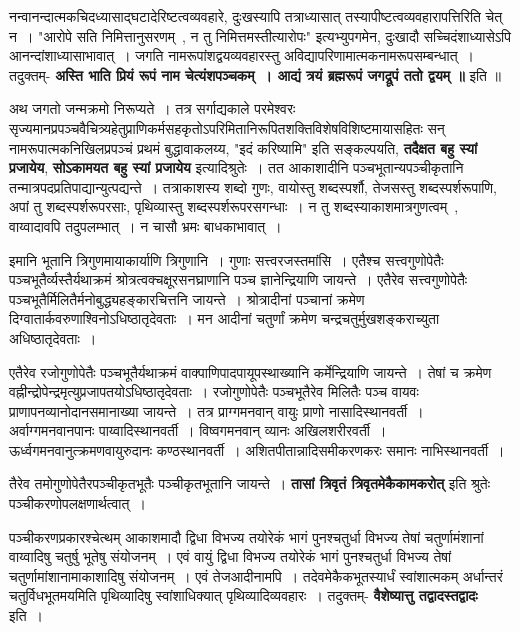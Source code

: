 	नन्वानन्दात्मकचिदध्यासाद्घटादेरिष्टत्वव्यवहारे, दुःखस्यापि तत्राध्यासात् तस्यापीष्टत्वव्यवहारापत्तिरिति चेत् न~। "आरोपे सति निमित्तानुसरणम्~, न तु निमित्तमस्तीत्यारोपः" इत्यभ्युपगमेन, दुःखादौ सच्चिदंशाध्यासेऽपि आनन्दांशाध्यासाभावात्~। जगति नामरूपांशद्वयव्यवहारस्तु अविद्यापरिणामात्मकनामरूपसम्बन्धात्~। तदुक्तम्- {\bfseries अस्ति भाति प्रियं रूपं नाम चेत्यंशपञ्चकम्~। आद्यं त्रयं ब्रह्मरूपं जगद्रूपं ततो द्वयम् ॥} इति ॥\par
	अथ जगतो जन्मक्रमो निरूप्यते~। तत्र सर्गाद्यकाले परमेश्वरः सृज्यमानप्रपञ्चवैचित्र्यहेतुप्राणिकर्मसहकृतोऽपरिमितानिरूपितशक्तिविशेषविशिष्टमायासहितः सन् नामरूपात्मकनिखिलप्रपञ्चं प्रथमं बुद्धावाकलय्य, "इदं करिष्यामि" इति सङ्कल्पयति, {\bfseries तदैक्षत बहु स्यां प्रजायेय}, {\bfseries सोऽकामयत बहु स्यां प्रजायेय} इत्यादिश्रुतेः~। तत आकाशादीनि पञ्चभूतान्यपञ्चीकृतानि तन्मात्रपदप्रतिपाद्यान्युत्पद्यन्ते~। तत्राकाशस्य शब्दो गुणः, वायोस्तु शब्दस्पर्शौ, तेजसस्तु शब्दस्पर्शरूपाणि, अपां तु शब्दस्पर्शरूपरसाः, पृथिव्यास्तु शब्दस्पर्शरूपरसगन्धाः~। न तु शब्दस्याकाशमात्रगुणत्वम्~, वाय्वादावपि तदुपलम्भात्~। न चासौ भ्रमः बाधकाभावात्~।\par
	इमानि भूतानि त्रिगुणमायाकार्याणि त्रिगुणानि~। गुणाः सत्त्वरजस्तमांसि~। एतैश्च सत्त्वगुणोपेतैः पञ्चभूतैर्व्यस्तैर्यथाक्रमं श्रोत्रत्वक्चक्षूरसनघ्राणानि पञ्च ज्ञानेन्द्रियाणि जायन्ते~। एतैरेव सत्त्वगुणोपेतैः पञ्चभूतैर्मिलितैर्मनोबुद्ध्यहङ्कारचित्तनि जायन्ते~। श्रोत्रादीनां पञ्चानां क्रमेण दिग्वातार्कवरुणाश्विनोऽधिष्ठातृदेवताः~। मन आदीनां चतुर्णां क्रमेण चन्द्रचतुर्मुखशङ्कराच्युता अधिष्ठातृदेवताः~।\par
	एतैरेव रजोगुणोपेतैः पञ्चभूतैर्यथाक्रमं वाक्पाणिपादपायूपस्थाख्यानि कर्मेन्द्रियाणि जायन्ते~। तेषां च क्रमेण वह्नीन्द्रोपेन्द्रमृत्युप्रजापतयोऽधिष्ठातृदेवताः~। रजोगुणोपेतैः पञ्चभूतैरेव मिलितैः पञ्च वायवः प्राणापनव्यानोदानसमानाख्या जायन्ते~। तत्र प्राग्गमनवान् वायुः प्राणो नासादिस्थानवर्ती~। अर्वाग्गमनवानपानः पाय्वादिस्थानवर्ती~। विष्वगमनवान् व्यानः अखिलशरीरवर्ती~। ऊर्ध्वगमनवानुत्क्रमणवायुरुदानः कण्ठस्थानवर्ती~। अशितपीतान्नादिसमीकरणकरः समानः नाभिस्थानवर्ती~।\par
	तैरेव तमोगुणोपेतैरपञ्चीकृतभूतैः पञ्चीकृतभूतानि जायन्ते~। {\bfseries तासां त्रिवृतं त्रिवृतमेकैकामकरोत्} इति श्रुतेः पञ्चीकरणोपलक्षणार्थत्वात्~।\par
	पञ्चीकरणप्रकारश्चेत्थम् आकाशमादौ द्विधा विभज्य तयोरेकं भागं पुनश्चतुर्धा विभज्य तेषां चतुर्णामंशानां वाय्वादिषु चतुर्षु भूतेषु संयोजनम्~। एवं वायुं द्विधा विभज्य तयोरेकं भागं पुनश्चतुर्धा विभज्य तेषां चतुर्णामांशानामाकाशादिषु संयोजनम्~। एवं तेजआदीनामपि~। तदेवमेकैकभूतस्यार्धं स्वांशात्मकम् अर्धान्तरं चतुर्विधभूतमयमिति पृथिव्यादिषु स्वांशाधिक्यात् पृथिव्यादिव्यवहारः~। तदुक्तम्- {\bfseries वैशेष्यात्तु तद्वादस्तद्वादः} इति~।\par
